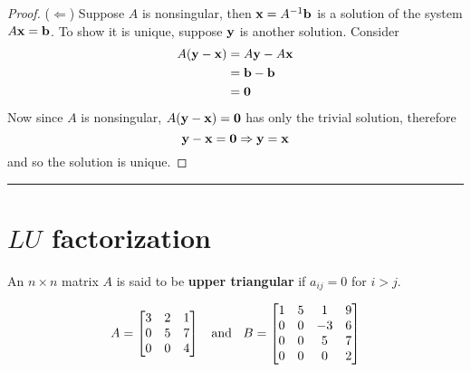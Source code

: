 \begin{enumerate}
\begin{corollary}
\begin{proof}
	 ($\Leftarrow$)   Suppose $A$ is nonsingular, then ${\bf x} = A^{-1} {\bf b}$ is a solution of the system $A {\bf x} = {\bf b}$.  To show it is unique, suppose ${\bf y}$ is another solution.  Consider
	 \begin{align*}
	 	A ( {\bf y} - {\bf x}) 	&= A {\bf y} - A {\bf x}\\
						&= {\bf b} - {\bf b}\\
	 					&= {\bf 0}
	 \end{align*}
Now since $A$ is nonsingular, 	 $A ( {\bf y} - {\bf x})  =  {\bf 0}$ has only the trivial solution, therefore 
\[  {\bf y} - {\bf x} = {\bf 0}  \Rightarrow {\bf y} = {\bf x} \]
and so the solution is unique.
	\end{proof}
\end{corollary}
\rule[0.01in]{\textwidth}{0.0025in}














\end{enumerate}





\section*{$LU$ factorization}


%
\begin{definition}
An $n \times n$ matrix $A$ is said to be \textbf{upper triangular} if $a_{ij} = 0$ for $i>j$.  
\end{definition}
\begin{example}
\[ A = \begin{bmatrix}  3 &  2  & 1\\ 0 & 5  &  7 \\  0 &  0 &  4   \end{bmatrix}   \text{\;\; and \;\;} B = \begin{bmatrix}  1 &  5  & 1 &  9\\ 0 & 0  &  -3  &  6 \\  0 &  0 &  5 &  7 \\ 0  &  0   &   0   & 2  \end{bmatrix}  \]
\end{example}


